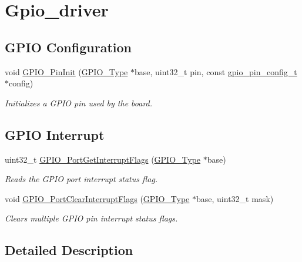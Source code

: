 \hypertarget{group__gpio__driver}{}\section{Gpio\+\_\+driver}
\label{group__gpio__driver}
\subsection*{G\+P\+IO Configuration}
\begin{DoxyCompactItemize}
\item 
void \mbox{\hyperlink{group__gpio__driver_ga0793a4e8cb6e746485012da3e487db53}{G\+P\+I\+O\+\_\+\+Pin\+Init}} (\mbox{\hyperlink{struct_g_p_i_o___type}{G\+P\+I\+O\+\_\+\+Type}} $\ast$base, uint32\+\_\+t pin, const \mbox{\hyperlink{group__gpio_ga9279df0a87f2432dc3c5d596028223b7}{gpio\+\_\+pin\+\_\+config\+\_\+t}} $\ast$config)
\begin{DoxyCompactList}\small\item\em Initializes a G\+P\+IO pin used by the board. \end{DoxyCompactList}\end{DoxyCompactItemize}
\subsection*{G\+P\+IO Interrupt}
\begin{DoxyCompactItemize}
\item 
uint32\+\_\+t \mbox{\hyperlink{group__gpio__driver_ga8685e0d5f2bc5573e9a229e9147cf143}{G\+P\+I\+O\+\_\+\+Port\+Get\+Interrupt\+Flags}} (\mbox{\hyperlink{struct_g_p_i_o___type}{G\+P\+I\+O\+\_\+\+Type}} $\ast$base)
\begin{DoxyCompactList}\small\item\em Reads the G\+P\+IO port interrupt status flag. \end{DoxyCompactList}\item 
void \mbox{\hyperlink{group__gpio__driver_ga2a8f3b5ceb113519221582c2ed741fb6}{G\+P\+I\+O\+\_\+\+Port\+Clear\+Interrupt\+Flags}} (\mbox{\hyperlink{struct_g_p_i_o___type}{G\+P\+I\+O\+\_\+\+Type}} $\ast$base, uint32\+\_\+t mask)
\begin{DoxyCompactList}\small\item\em Clears multiple G\+P\+IO pin interrupt status flags. \end{DoxyCompactList}\end{DoxyCompactItemize}


\subsection{Detailed Description}


